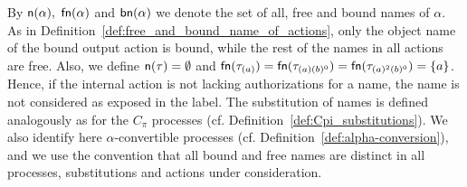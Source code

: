 By $\mathsf{n}(\alpha),$ $\mathsf{fn}(\alpha)$ and $\mathsf{bn}(\alpha)$ we denote the set of all, free and bound names of $\alpha$. As in Definition~\ref{def:free_and_bound_name_of_actions}, only the object name of the bound output action is bound, while the rest of the names in all actions are free. Also, we define $\mathsf{n}(\tau)=\emptyset$ and $\mathsf{fn}(\tau_{(a)})=\mathsf{fn}(\tau_{(a)(b)^0})=\mathsf{fn}(\tau_{(a)^{2}(b)^0})=\{a\}$. Hence, if the internal action is not lacking authorizations for a name, the name is not considered as exposed in the label.
The substitution of names is defined analogously as for the $C_\pi$ processes (cf. Definition~\ref{def:Cpi_substitutions}).
We also identify here $\alpha$-convertible processes (cf. Definition~\ref{def:alpha-conversion}), and we use the convention that all bound and free names are distinct in all processes, substitutions and actions under consideration.


